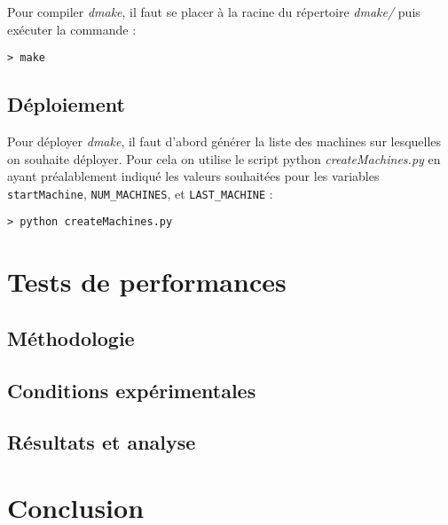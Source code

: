 \documentclass[a4paper,12pt,twoside]{article}
\begin{document}
Pour compiler \emph{dmake}, il faut se placer à la racine du
répertoire \emph{dmake/} puis exécuter la commande :
\begin{verbatim}
> make
\end{verbatim}

\subsection{Déploiement}

Pour déployer \emph{dmake}, il faut d'abord générer la liste des
machines sur lesquelles on souhaite déployer. Pour cela on utilise le
script python \emph{createMachines.py} en ayant préalablement indiqué
les valeurs souhaitées pour les variables \texttt{startMachine},
\texttt{NUM\_MACHINES}, et \texttt{LAST\_MACHINE} : 
\begin{verbatim}
> python createMachines.py
\end{verbatim}



\section{Tests de performances}

\subsection{Méthodologie}

\subsection{Conditions expérimentales}

\subsection{Résultats et analyse}

\section*{Conclusion}
\end{document}
